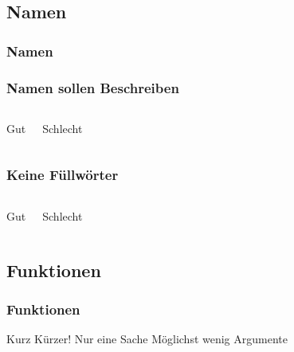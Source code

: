\documentclass{beamer}
\begin{document}
\subsection{Namen}
\begin{frame}
    \frametitle{Namen}
\end{frame}
\begin{frame}
    \frametitle{Namen sollen Beschreiben}
    \begin{columns}[t]
        \begin{center}
            \huge \color{green} Gut
        \end{center}
        \begin{center}
            \huge \color{red} Schlecht
        \end{center}
    \end{columns}
\end{frame}
\begin{frame}
    \frametitle{Keine Füllwörter}
    \begin{columns}[t]
        \begin{center}
            \huge \color{green} Gut
        \end{center}
        \begin{center}
            \huge \color{red} Schlecht
        \end{center}
    \end{columns}
\end{frame}

\subsection{Funktionen}
\begin{frame}
    \frametitle{Funktionen}
    \begin{outline}
        \1 Kurz
        \1 Kürzer!
        \1 Nur eine Sache
        \1 Möglichst wenig Argumente
    \end{outline}
\end{frame}
\end{document}

